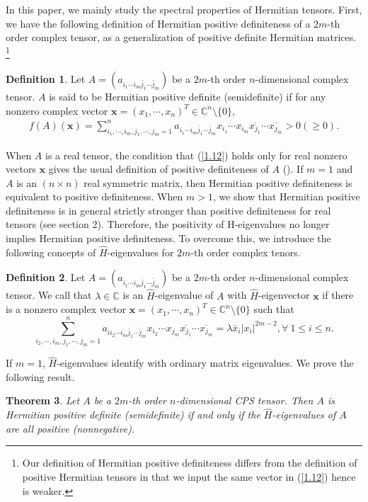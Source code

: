 \documentclass[10pt,reqno]{amsart}
\newtheorem{thm}{Theorem}[section]
\theoremstyle{definition}
\newtheorem{defn}[thm]{Definition}
\begin{document}
In this paper, we mainly study the spectral properties of Hermitian tensors. First, we have the following definition of Hermitian positive definiteness of a $2m$-th order complex tensor, as a generalization of positive definite Hermitian matrices. \footnote{Our definition of Hermitian positive definiteness differs from the definition of positive Hermitian tensors in \cite{N} that we input the same vector in (\ref{1.12}) hence is weaker.}
\begin{defn} \label{complex1}
Let $A=(a_{i_1\cdots i_m\bar{j}_1\cdots \bar{j}_m})$ be a $2m$-th order $n$-dimensional complex tensor. $A$ is said to be Hermitian positive definite (semidefinite) if for any nonzero complex vector $\mathbf{x}=(x_1,\cdots, x_n)^T\in \mathbb C^n\setminus \{0\}$, \begin{align} f(A)(\mathbf{x})=\sum_{i_1,\cdots, i_m, j_1, \cdots, j_m=1}^n a_{i_1\cdots i_m\bar{j}_1\cdots \bar{j}_m} x_{i_1}\cdots x_{i_m}\overline{x_{j_1}}\cdots\overline{x_{j_m}}>0 (\geq 0).\label{1.12}\end{align}
\end{defn}

When $A$ is a real tensor, the condition that (\ref{1.12}) holds only for real nonzero vectors $\mathbf{x}$ gives the usual definition of positive definiteness of $A$ (\cite{QL}). If $m=1$ and $A$ is an $(n\times n)$ real symmetric matrix, then Hermitian positive definiteness is equivalent to positive definiteness. When $m>1$, we show that Hermitian positive definiteness is in general strictly stronger than positive definiteness for real tensors (see section 2). Therefore, the positivity of H-eigenvalues no longer implies Hermitian positive definiteness. To overcome this, we introduce the following concepts of $\hat{H}$-eigenvalues for $2m$-th order complex tenors.
\begin{defn}
Let $A=(a_{i_1\cdots i_m\bar{j}_1\cdots \bar{j}_m})$ be a $2m$-th order $n$-dimensional complex tensor. We call that $\lambda\in \mathbb C$ is an $\hat{H}$-eigenvalue of $A$ with $\hat{H}$-eigenvector $\mathbf{x}$ if there is a nonzero complex vector $\mathbf{x}=(x_1,\cdots, x_n)^T\in \mathbb C^n\setminus \{0\}$ such that $$\sum_{i_2,\cdots, i_m, j_1, \cdots, j_m=1}^n a_{ii_2\cdots i_m\bar{j}_1\cdots \bar{j}_m} x_{i_2}\cdots x_{j_m}\overline{x_{j_1}}\cdots\overline{x_{j_m}}=\lambda \bar{x}_{i}|x_{i}|^{2m-2}, {\forall}\  1\leq i\leq n.$$ 
	\end{defn}
 If $m=1$,  $\hat{H}$-eigenvalues identify with ordinary matrix eigenvalues. We prove the following result.
\begin{thm} \label{thm1.2}
Let $A$ be a $2m$-th order $n$-dimensional CPS tensor. Then $A$ is Hermitian positive definite (semidefinite) if and only if the $\hat{H}$-eigenvalues of $A$ are all positive (nonnegative). 
\end{thm}
\end{document}
